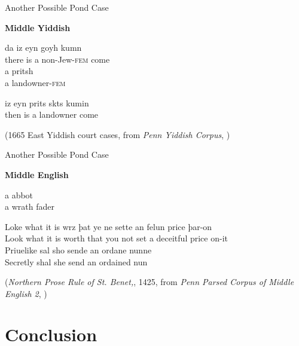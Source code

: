 \documentclass[hyperref={pdfpagelabels=false}]{beamer}
\begin{document}
\begin{frame}{Another Possible Pond Case}
 
 \begin{exe}

 	\ex \textbf{Middle Yiddish}
 	\begin{xlist} 
 		\ex \gll da iz eyn goyh kumn\\
 		there is a non-Jew-\textsc{fem} come\\
 		\ex  \gll a pritsh\\
 		a landowner-\textsc{fem}\\
 	\end{xlist}
 	\ex \begin{xlist}
 		 \ex {} iz eyn {prits skts} kumin\\
 		 then is a landowner come\\
 		\end{xlist}
 	(1665 East Yiddish court cases, from \textsl{Penn Yiddish Corpus}, \citealt{santorini2008})
 \end{exe}  

   
  
  
\end{frame}

\begin{frame}{Another Possible Pond Case}

\begin{exe}
	\ex \textbf{Middle English}
	\begin{xlist} 
		\ex  a abbot\\
		\ex  a wrath fader\\
	\end{xlist}
	\ex \begin{xlist} 
		\ex \gll Loke what it is wrz þat ye ne sette an felun price þar-on\\
		Look what it is worth that you not set a deceitful price on-it\\
		\ex \gll Priuelike sal sho sende an ordane nunne\\
		Secretly shal she send an ordained nun\\
	\end{xlist}
	(\textsl{Northern Prose Rule of St. Benet,}, 1425, from  \textsl{Penn Parsed Corpus of Middle English 2}, \citealt{ppcme2})
\end{exe}  




\end{frame}




\section{Conclusion}
\end{document}
